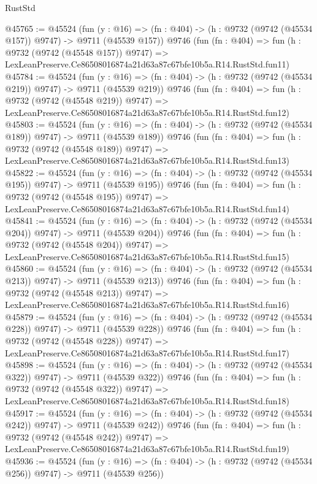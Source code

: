 \begin{lexlean}{RustStd}
\begin{coremodule}
@45765 := @45524
    (fun (y : @16) => (fn : @404) -> (h : @9732 (@9742 (@45534 @157)) @9747) -> @9711 (@45539 @157))
    @9746
    (fun (fn : @404) =>
    fun (h : @9732 (@9742 (@45548 @157)) @9747) =>
    LexLeanPreserve.Ce86508016874a21d63a87c67bfe10b5a.R14.RustStd.fun11)
@45784 := @45524
    (fun (y : @16) => (fn : @404) -> (h : @9732 (@9742 (@45534 @219)) @9747) -> @9711 (@45539 @219))
    @9746
    (fun (fn : @404) =>
    fun (h : @9732 (@9742 (@45548 @219)) @9747) =>
    LexLeanPreserve.Ce86508016874a21d63a87c67bfe10b5a.R14.RustStd.fun12)
@45803 := @45524
    (fun (y : @16) => (fn : @404) -> (h : @9732 (@9742 (@45534 @189)) @9747) -> @9711 (@45539 @189))
    @9746
    (fun (fn : @404) =>
    fun (h : @9732 (@9742 (@45548 @189)) @9747) =>
    LexLeanPreserve.Ce86508016874a21d63a87c67bfe10b5a.R14.RustStd.fun13)
@45822 := @45524
    (fun (y : @16) => (fn : @404) -> (h : @9732 (@9742 (@45534 @195)) @9747) -> @9711 (@45539 @195))
    @9746
    (fun (fn : @404) =>
    fun (h : @9732 (@9742 (@45548 @195)) @9747) =>
    LexLeanPreserve.Ce86508016874a21d63a87c67bfe10b5a.R14.RustStd.fun14)
@45841 := @45524
    (fun (y : @16) => (fn : @404) -> (h : @9732 (@9742 (@45534 @204)) @9747) -> @9711 (@45539 @204))
    @9746
    (fun (fn : @404) =>
    fun (h : @9732 (@9742 (@45548 @204)) @9747) =>
    LexLeanPreserve.Ce86508016874a21d63a87c67bfe10b5a.R14.RustStd.fun15)
@45860 := @45524
    (fun (y : @16) => (fn : @404) -> (h : @9732 (@9742 (@45534 @213)) @9747) -> @9711 (@45539 @213))
    @9746
    (fun (fn : @404) =>
    fun (h : @9732 (@9742 (@45548 @213)) @9747) =>
    LexLeanPreserve.Ce86508016874a21d63a87c67bfe10b5a.R14.RustStd.fun16)
@45879 := @45524
    (fun (y : @16) => (fn : @404) -> (h : @9732 (@9742 (@45534 @228)) @9747) -> @9711 (@45539 @228))
    @9746
    (fun (fn : @404) =>
    fun (h : @9732 (@9742 (@45548 @228)) @9747) =>
    LexLeanPreserve.Ce86508016874a21d63a87c67bfe10b5a.R14.RustStd.fun17)
@45898 := @45524
    (fun (y : @16) => (fn : @404) -> (h : @9732 (@9742 (@45534 @322)) @9747) -> @9711 (@45539 @322))
    @9746
    (fun (fn : @404) =>
    fun (h : @9732 (@9742 (@45548 @322)) @9747) =>
    LexLeanPreserve.Ce86508016874a21d63a87c67bfe10b5a.R14.RustStd.fun18)
@45917 := @45524
    (fun (y : @16) => (fn : @404) -> (h : @9732 (@9742 (@45534 @242)) @9747) -> @9711 (@45539 @242))
    @9746
    (fun (fn : @404) =>
    fun (h : @9732 (@9742 (@45548 @242)) @9747) =>
    LexLeanPreserve.Ce86508016874a21d63a87c67bfe10b5a.R14.RustStd.fun19)
@45936 := @45524
    (fun (y : @16) => (fn : @404) -> (h : @9732 (@9742 (@45534 @256)) @9747) -> @9711 (@45539 @256))

\end{coremodule}
\end{lexlean}
